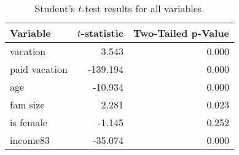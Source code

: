 \documentclass{article}
\begin{document}
    \setlength{\extrarowheight}{3pt}
    \begin{table}[h]
    \centering
    \hspace*{-1.5cm}
    \begin{tabular}{l|r|r}
      Variable      & $t$-statistic & Two-Tailed p-Value \\ \hline \hline
      vacation      &         3.543 &              0.000 \\ \hline
      paid vacation &      -139.194 &              0.000 \\ \hline
      age           &       -10.934 &              0.000 \\ \hline
      fam size      &         2.281 &              0.023 \\ \hline
      is female     &        -1.145 &              0.252 \\ \hline
      income83      &       -35.074 &              0.000
    \end{tabular}
    \hspace*{-1.5cm}
    \caption{Student's $t$-test results for all variables.}
    \end{table}
\end{document}
